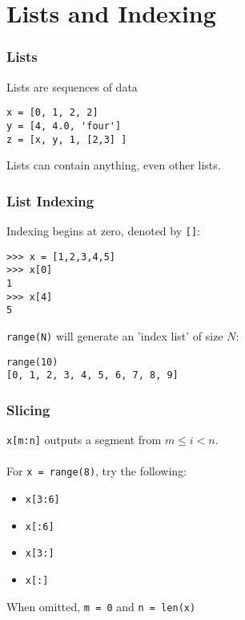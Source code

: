 \documentclass[red]{beamer}
\begin{document}
\section[Lists]{Lists and Indexing}
\begin{frame}[fragile]
    \frametitle{Lists}
    
    Lists are sequences of data
    \begin{lstlisting}
x = [0, 1, 2, 2]
y = [4, 4.0, 'four']
z = [x, y, 1, [2,3] ]
    \end{lstlisting}
    Lists can contain anything, even other lists.

\end{frame}
\begin{frame}[fragile]
    \frametitle{List Indexing}

    Indexing begins at zero, denoted by \texttt{[]}:
    \begin{lstlisting}
>>> x = [1,2,3,4,5]
>>> x[0]
1
>>> x[4]
5
    \end{lstlisting}

    \lstinline!range(N)! will generate an 'index list' of size $N$:
    \begin{lstlisting}
range(10)
[0, 1, 2, 3, 4, 5, 6, 7, 8, 9]
    \end{lstlisting}
\end{frame}
\begin{frame}
    \frametitle{Slicing}

    \texttt{x[m:n]} outputs a segment from $m \leq i < n$.
    \\~\\    
    For \texttt{x = range(8)}, try the following:
    \begin{itemize}
        \item \texttt{x[3:6]}\\
        \item \texttt{x[:6]}\\
        \item \texttt{x[3:]}\\
        \item \texttt{x[:]}\\
    \end{itemize}
    When omitted, \texttt{m = 0} and \texttt{n = len(x)}
\end{frame}
\end{document}
